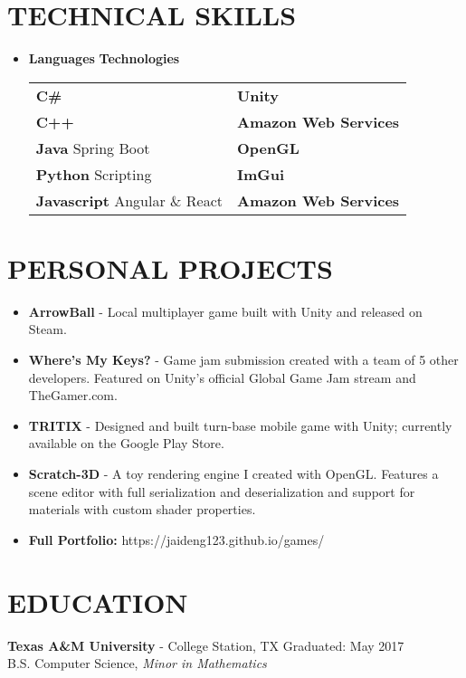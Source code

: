 \documentclass[margin,10pt]{res} %
\begin{document}
\begin{resume}
                    
\section{TECHNICAL SKILLS}	
							\begin{itemize}
                    		\item[] 
\textbf{\large Languages}  \hspace*{1in} \textbf{\large Technologies}        \\
\begin{tabular}{ll}
\textbf{C\#}  & \textbf{Unity} \\
\textbf{C++} & \textbf{Amazon Web Services} \\
\textbf{Java} Spring Boot   & \textbf{OpenGL}       \\
\textbf{Python} Scripting  & \textbf{ImGui}               \\
\textbf{Javascript} Angular \& React & \textbf{Amazon Web Services} \\                
\end{tabular}
                    		\end{itemize} 
\section{PERSONAL PROJECTS}
				\begin{itemize}       
				\item \textbf{ArrowBall} - Local multiplayer game built with Unity and released on Steam.
                	\item \textbf{Where's My Keys?} - Game jam submission created with a team of 5 other developers. Featured on Unity's official Global Game Jam stream and TheGamer.com.
                	\item \textbf{TRITIX} - Designed and built turn-base mobile game with Unity; currently available on the Google Play Store.
                	\item \textbf{Scratch-3D} - A toy rendering engine I created with OpenGL. Features a scene editor with full serialization and deserialization and support for materials with custom shader properties.
                	\item \textbf{Full Portfolio:} https://jaideng123.github.io/games/
                \end{itemize}
                
\section{EDUCATION}
{\bf Texas A\&M University} - College Station, TX \hfill
Graduated: May 2017 \\
B.S. Computer Science,
\textit{Minor in Mathematics}
\end{resume} 
\end{document}
